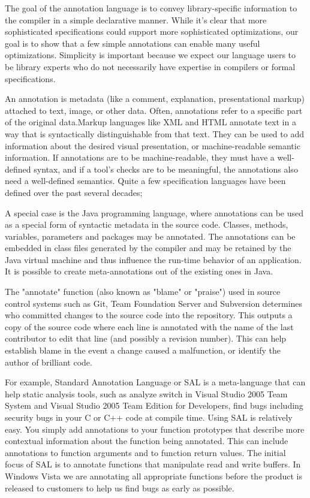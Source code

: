The goal of the annotation language is to convey library-specific information to the compiler in a simple declarative manner. While it's clear that more sophisticated specifications could support more sophisticated optimizations, our goal is to show that a few simple annotations can enable many useful optimizations. Simplicity is important because we expect our language users to be library experts who do not necessarily have expertise in compilers or formal specifications.

An annotation is metadata (like a comment, explanation, presentational markup) attached to text, image, or other data. Often, annotations refer to a specific part of the original data.Markup languages like XML and HTML annotate text in a way that is syntactically distinguishable from that text. They can be used to add information about the desired visual presentation, or machine-readable semantic information. If annotations are to be machine-readable, they must have a well-defined syntax, and if a tool's checks are to be meaningful, the annotations also need a well-defined semantics. Quite a few specification languages have been defined over the past several decades; 

A special case is the Java programming language, where annotations can be used as a special form of syntactic metadata in the source code. Classes, methods, variables, parameters and packages may be annotated. The annotations can be embedded in class files generated by the compiler and may be retained by the Java virtual machine and thus influence the run-time behavior of an application. It is possible to create meta-annotations out of the existing ones in Java.

The "annotate" function (also known as "blame" or "praise") used in source control systems such as Git, Team Foundation Server and Subversion determines who committed changes to the source code into the repository. This outputs a copy of the source code where each line is annotated with the name of the last contributor to edit that line (and possibly a revision number). This can help establish blame in the event a change caused a malfunction, or identify the author of brilliant code.

For example, Standard Annotation Language or SAL \cite{ref_51_microsoft:sal} is a meta-language that can help static analysis tools, such as analyze switch in Visual Studio 2005 Team System and Visual Studio 2005 Team Edition for Developers, find bugs including security bugs in your C or C++ code at compile time.
Using SAL is relatively easy. You simply add annotations to your function prototypes that describe more contextual information about the function being annotated. This can include annotations to function arguments and to function return values. The initial focus of SAL is to annotate functions that manipulate read and write buffers. In Windows Vista we are annotating all appropriate functions before the product is released to customers to help us find bugs as early as possible.

